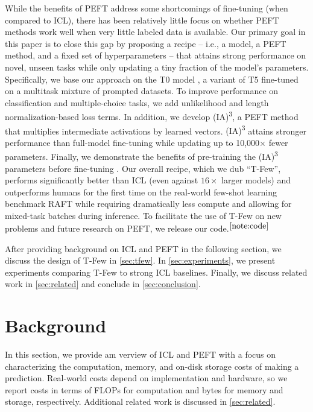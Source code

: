 While the benefits of PEFT address some shortcomings of fine-tuning (when compared to ICL), there has been relatively little focus on whether PEFT methods work well when very little labeled data is available. Our primary goal in this paper is to close this gap by proposing a recipe -- i.e., a model, a PEFT method, and a fixed set of hyperparameters -- that attains strong performance on novel, unseen tasks while only updating a tiny fraction of the model's parameters. Specifically, we base our approach on the T0 model \cite{sanh2021multitask}, a variant of T5 \cite{raffel2019exploring} fine-tuned on a multitask mixture of prompted datasets. To improve performance on classification and multiple-choice tasks, we add unlikelihood \cite{tam2021improving,welleck2019neural} and length normalization-based \citep{brown2020language} loss terms. In addition, we develop {\selectfont (IA)\textsuperscript{3}}, a PEFT method that multiplies intermediate activations by learned vectors.
{\selectfont (IA)\textsuperscript{3}} attains stronger performance than full-model fine-tuning while updating up to 10,000$\times$ fewer parameters. Finally, we demonstrate the benefits of pre-training the {\selectfont (IA)\textsuperscript{3}} parameters before fine-tuning \citep{gu2021ppt, vu2021spot}. Our overall recipe, which we dub ``{\selectfont T-Few}'', performs significantly better than ICL (even against $16\times$ larger models) and outperforms humans for the first time on the real-world few-shot learning benchmark RAFT \citep{alex2021raft} while requiring dramatically less compute and allowing for mixed-task batches during inference. To facilitate the use of {\selectfont T-Few} on new problems and future research on PEFT, we release our code.$^{\ref{note:code}}$

After providing background on ICL and PEFT in the following section, we discuss the design of {\selectfont T-Few} in \ref{sec:tfew}.
In \ref{sec:experiments}, we present experiments comparing {\selectfont T-Few} to strong ICL baselines. Finally, we discuss related work in \ref{sec:related} and conclude in \ref{sec:conclusion}.

\section{Background}
In this section, we provide am verview of ICL and PEFT with a focus on characterizing the computation, memory, and on-disk storage costs of making a prediction. Real-world costs depend on implementation and hardware, so we report costs in terms of FLOPs for computation and bytes for memory and storage, respectively. Additional related work is discussed in \ref{sec:related}.

